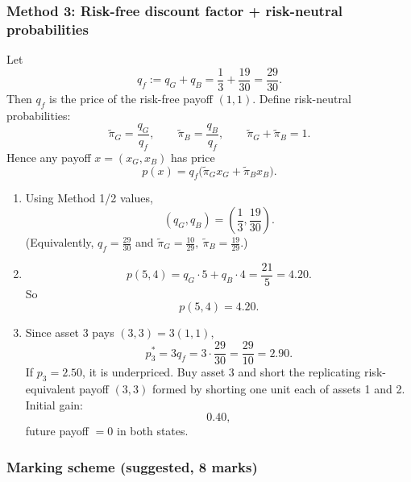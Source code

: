 \documentclass[12pt]{article}
\begin{document}
\subsubsection*{Method 3: Risk-free discount factor + risk-neutral probabilities}

Let
\[
q_f:=q_G+q_B=\frac13+\frac{19}{30}=\frac{29}{30}.
\]
Then \(q_f\) is the price of the risk-free payoff \((1,1)\). Define risk-neutral probabilities:
\[
\tilde\pi_G=\frac{q_G}{q_f},\qquad \tilde\pi_B=\frac{q_B}{q_f},
\qquad \tilde\pi_G+\tilde\pi_B=1.
\]
Hence any payoff \(x=(x_G,x_B)\) has price
\[
p(x)=q_f\big(\tilde\pi_G x_G+\tilde\pi_B x_B\big).
\]

\begin{enumerate}[label=(\alph*)]
\item Using Method 1/2 values,
\[
\boxed{(q_G,q_B)=\left(\frac13,\frac{19}{30}\right).}
\]
(Equivalently,
\(
q_f=\frac{29}{30}
\)
and
\(
\tilde\pi_G=\frac{10}{29},\ \tilde\pi_B=\frac{19}{29}.
\))

\item
\[
p(5,4)=q_G\cdot 5+q_B\cdot 4=\frac{21}{5}=4.20.
\]
So
\[
\boxed{p(5,4)=4.20.}
\]

\item Since asset 3 pays \((3,3)=3(1,1)\),
\[
p_3^*=3q_f=3\cdot \frac{29}{30}=\frac{29}{10}=2.90.
\]
If \(p_3=2.50\), it is underpriced. Buy asset 3 and short the replicating risk-equivalent payoff \((3,3)\) formed by shorting one unit each of assets 1 and 2. Initial gain:
\[
\boxed{0.40},
\]
future payoff \(=0\) in both states.
\end{enumerate}
\newpage
\subsubsection*{Marking scheme (suggested, 8 marks)}
\end{document}
